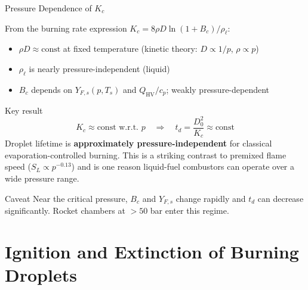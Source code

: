 \documentclass[12pt,aspectratio=169]{beamer}
\newcommand{\Ts}{T_s}
\newcommand{\Yfs}{Y_{F,s}}
\newcommand{\Bc}{B_c}
\newcommand{\Kc}{K_c}
\newcommand{\td}{t_d}
\begin{document}
\begin{frame}{Pressure Dependence of $\Kc$}

  From the burning rate expression
  $\Kc = 8\rho D\ln(1+\Bc)/\rho_\ell$:
  \begin{itemize}
    \item $\rho D \approx \text{const}$ at fixed temperature
          (kinetic theory: $D \propto 1/p$, $\rho \propto p$)
    \item $\rho_\ell$ is nearly pressure-independent (liquid)
    \item $\Bc$ depends on $\Yfs(p, \Ts)$ and $Q_{\text{HV}}/c_p$;
          weakly pressure-dependent
  \end{itemize}

  \begin{block}{Key result}
    \[
      \Kc \approx \text{const} \text{ w.r.t.\ } p
      \quad\Rightarrow\quad
      \td = \frac{D_0^2}{\Kc} \approx \text{const}
    \]
    Droplet lifetime is \textbf{approximately pressure-independent}
    for classical evaporation-controlled burning.
    This is a striking contrast to premixed flame speed
    ($S_L \propto p^{-0.13}$) and is one reason liquid-fuel
    combustors can operate over a wide pressure range.
  \end{block}

  \begin{alertblock}{Caveat}
    Near the critical pressure, $\Bc$ and $\Yfs$ change rapidly
    and $\td$ can decrease significantly.
    Rocket chambers at $> 50$ bar enter this regime.
  \end{alertblock}
\end{frame}

\section{Ignition and Extinction of Burning Droplets}
\end{document}
